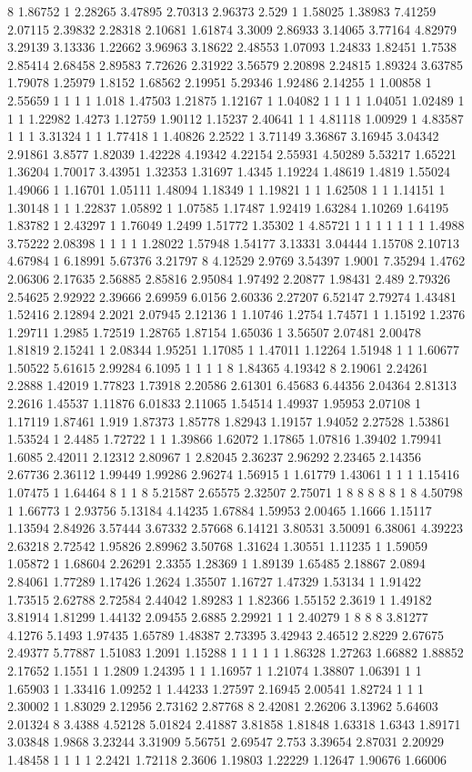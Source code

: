 8 1.86752 1 2.28265 3.47895 2.70313 2.96373 2.529 1 1.58025 1.38983 7.41259 2.07115 2.39832 2.28318 2.10681 1.61874 3.3009 2.86933 3.14065 3.77164 4.82979 3.29139 3.13336 1.22662 3.96963 3.18622 2.48553 1.07093 1.24833 1.82451 1.7538 2.85414 2.68458 2.89583 7.72626 2.31922 3.56579 2.20898 2.24815 1.89324 3.63785 1.79078 1.25979 1.8152 1.68562 2.19951 5.29346 1.92486 2.14255 1 1.00858 1 2.55659 1 1 1 1 1.018 1.47503 1.21875 1.12167 1 1.04082 1 1 1 1 1.04051 1.02489 1 1 1 1.22982 1.4273 1.12759 1.90112 1.15237 2.40641 1 1 4.81118 1.00929 1 4.83587 1 1 1 3.31324 1 1 1.77418 1 1.40826 2.2522 1 3.71149 3.36867 3.16945 3.04342 2.91861 3.8577 1.82039 1.42228 4.19342 4.22154 2.55931 4.50289 5.53217 1.65221 1.36204 1.70017 3.43951 1.32353 1.31697 1.4345 1.19224 1.48619 1.4819 1.55024 1.49066 1 1.16701 1.05111 1.48094 1.18349 1 1.19821 1 1 1.62508 1 1 1.14151 1 1.30148 1 1 1.22837 1.05892 1 1.07585 1.17487 1.92419 1.63284 1.10269 1.64195 1.83782 1 2.43297 1 1.76049 1.2499 1.51772 1.35302 1 4.85721 1 1 1 1 1 1 1 1.4988 3.75222 2.08398 1 1 1 1 1.28022 1.57948 1.54177 3.13331 3.04444 1.15708 2.10713 4.67984 1 6.18991 5.67376 3.21797 8 4.12529 2.9769 3.54397 1.9001 7.35294 1.4762 2.06306 2.17635 2.56885 2.85816 2.95084 1.97492 2.20877 1.98431 2.489 2.79326 2.54625 2.92922 2.39666 2.69959 6.0156 2.60336 2.27207 6.52147 2.79274 1.43481 1.52416 2.12894 2.2021 2.07945 2.12136 1 1.10746 1.2754 1.74571 1 1.15192 1.2376 1.29711 1.2985 1.72519 1.28765 1.87154 1.65036 1 3.56507 2.07481 2.00478 1.81819 2.15241 1 2.08344 1.95251 1.17085 1 1.47011 1.12264 1.51948 1 1 1.60677 1.50522 5.61615 2.99284 6.1095 1 1 1 1 8 1.84365 4.19342 8 2.19061 2.24261 2.2888 1.42019 1.77823 1.73918 2.20586 2.61301 6.45683 6.44356 2.04364 2.81313 2.2616 1.45537 1.11876 6.01833 2.11065 1.54514 1.49937 1.95953 2.07108 1 1.17119 1.87461 1.919 1.87373 1.85778 1.82943 1.19157 1.94052 2.27528 1.53861 1.53524 1 2.4485 1.72722 1 1 1.39866 1.62072 1.17865 1.07816 1.39402 1.79941 1.6085 2.42011 2.12312 2.80967 1 2.82045 2.36237 2.96292 2.23465 2.14356 2.67736 2.36112 1.99449 1.99286 2.96274 1.56915 1 1.61779 1.43061 1 1 1 1.15416 1.07475 1 1.64464 8 1 1 8 5.21587 2.65575 2.32507 2.75071 1 8 8 8 8 8 1 8 4.50798 1 1.66773 1 2.93756 5.13184 4.14235 1.67884 1.59953 2.00465 1.1666 1.15117 1.13594 2.84926 3.57444 3.67332 2.57668 6.14121 3.80531 3.50091 6.38061 4.39223 2.63218 2.72542 1.95826 2.89962 3.50768 1.31624 1.30551 1.11235 1 1.59059 1.05872 1 1.68604 2.26291 2.3355 1.28369 1 1.89139 1.65485 2.18867 2.0894 2.84061 1.77289 1.17426 1.2624 1.35507 1.16727 1.47329 1.53134 1 1.91422 1.73515 2.62788 2.72584 2.44042 1.89283 1 1.82366 1.55152 2.3619 1 1.49182 3.81914 1.81299 1.44132 2.09455 2.6885 2.29921 1 1 2.40279 1 8 8 8 3.81277 4.1276 5.1493 1.97435 1.65789 1.48387 2.73395 3.42943 2.46512 2.8229 2.67675 2.49377 5.77887 1.51083 1.2091 1.15288 1 1 1 1 1 1.86328 1.27263 1.66882 1.88852 2.17652 1.1551 1 1.2809 1.24395 1 1 1.16957 1 1.21074 1.38807 1.06391 1 1 1.65903 1 1.33416 1.09252 1 1.44233 1.27597 2.16945 2.00541 1.82724 1 1 1 2.30002 1 1.83029 2.12956 2.73162 2.87768 8 2.42081 2.26206 3.13962 5.64603 2.01324 8 3.4388 4.52128 5.01824 2.41887 3.81858 1.81848 1.63318 1.6343 1.89171 3.03848 1.9868 3.23244 3.31909 5.56751 2.69547 2.753 3.39654 2.87031 2.20929 1.48458 1 1 1 1 2.2421 1.72118 2.3606 1.19803 1.22229 1.12647 1.90676 1.66006 